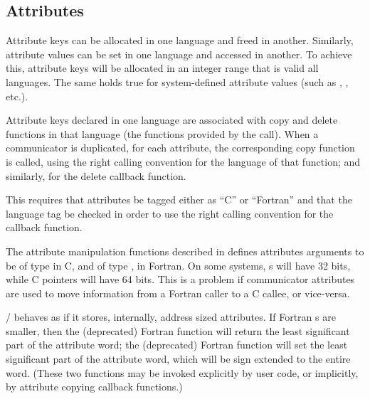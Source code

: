 \subsection{Attributes}
\label{sec:misc-attr}


Attribute keys can be allocated in one language and freed in another.
Similarly, attribute values can be set in one language and accessed in
another.  To achieve this, attribute keys will be allocated in an integer
range that is valid all languages.  The same holds true for system-defined
attribute values (such as ,
, etc.).

Attribute keys declared in one language are associated with copy and
delete functions in that language
%
%
%
%
%
%
(the functions provided by the  call).
When a
communicator is duplicated, for each attribute, the corresponding copy
function is called, using the right calling
convention for the language of that function; and similarly, for the
delete callback function.

\begin{implementors}
This requires that attributes be tagged either as
``C'' or ``Fortran''
 and that the language tag be checked in order to use
the right calling convention for the callback function.
\end{implementors}

The attribute manipulation functions described in
defines
attributes arguments to be of type  in C, and of type
, in Fortran.  On some systems,
s will have 32 bits, while
C pointers will have
64 bits.  This is a problem if communicator attributes are used to
move information from a Fortran caller to a
C callee, or
vice-versa.

\MPI/ behaves as if it stores,
internally, address sized attributes.  If Fortran s
are smaller, then the (deprecated) Fortran function  will
return the least significant part of the attribute word; the (deprecated) Fortran
function  will set the least significant part
of the attribute word, which will be sign extended to the entire word.
(These two functions may be invoked explicitly by user code, or
implicitly, by attribute copying callback functions.)

